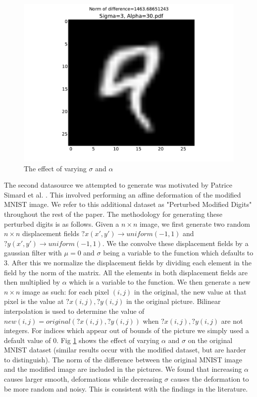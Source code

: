 \documentclass[conference]{IEEEtran}
\begin{document}
\begin{figure}[h]
	\includegraphics[scale=0.20]{Sigma=3,Alpha=30.pdf}
	\caption{The effect of varying $\sigma$ and $\alpha$}
	\label{Perturbed}
\end{figure}

The second datasource we attempted to generate was motivated by Patrice Simard et al. \cite{Simard}. This involved performing an affine deformation of the modified MNIST image. We refer to this additional dataset as "Perturbed Modified Digits" throughout the rest of the paper. The methodology for generating these perturbed digits is as follows. Given a $n\times n$ image, we first generate two random $n\times n$ displacement fields $?x(x',y')\rightarrow uniform(-1,1)$ and $?y(x',y')\rightarrow uniform(-1,1)$. We the convolve these displacement fields by a gaussian filter with $\mu = 0$ and $\sigma$ being a variable to the function which defaults to 3. After this we normalize the displacement fields by dividing each element in the field by the norm of the matrix. All the elements in both displacement fields are then multiplied by $\alpha$ which is a variable to the function. We then generate a new $n\times n$ image as such: for each pixel $(i,j)$ in the original, the new value at that pixel is the value at $?x(i,j),?y(i,j)$ in the original picture. Bilinear interpolation is used to determine the value of $new(i,j)=original(?x(i,j),?y(i,j))$ when $?x(i,j),?y(i,j)$ are not integers. For indices which appear out of bounds of the picture we simply used a default value of 0. Fig \ref{Perturbed} shows the effect of varying $\alpha$ and $\sigma$ on the original MNIST dataset (similar results occur with the modified dataset, but are harder to distinguish). The norm of the difference between the original MNIST image and the modified image are included in the pictures. We found that increasing $\alpha$ causes larger smooth, deformations while decreasing $\sigma$ causes the deformation to be more random and noisy. This is consistent with the findings in the literature.
\end{document}
